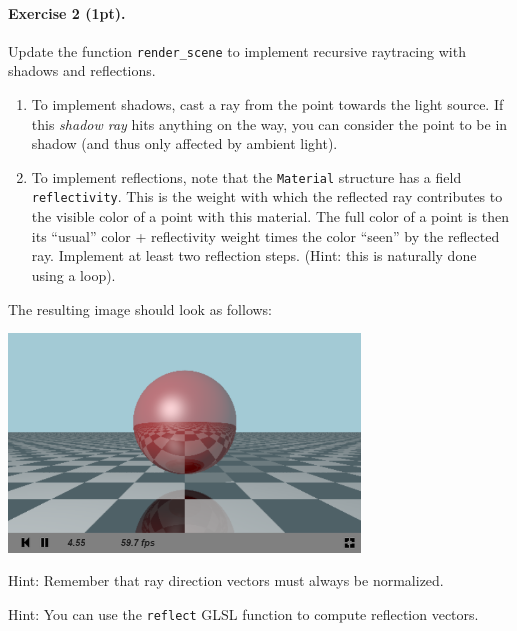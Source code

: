 \documentclass{article}
\newenvironment{exercise}[2]{\paragraph{Exercise #1 (#2pt).} }{
\medskip}
\begin{document}
\begin{exercise}{2}{1}
Update the function \verb#render_scene# to implement recursive raytracing with shadows and reflections.
\begin{enumerate}
\item To implement shadows, cast a ray from the point towards the light source. If this \emph{shadow ray} hits anything on the way, you can consider the point to be in shadow (and thus only affected by ambient light).
\item To implement reflections, note that the \verb#Material# structure has a field \verb#reflectivity#. This is the weight with which the reflected ray contributes to the visible color of a point with this material. The full color of a point is then its ``usual'' color + reflectivity weight times the color ``seen'' by the reflected ray. Implement at least two reflection steps. (Hint: this is naturally done using a loop).
\end{enumerate}
The resulting image should look as follows:
\begin{center}
\includegraphics[width=0.7\textwidth]{raytracing.png}
\end{center}

Hint: Remember that ray direction vectors must always be normalized.

Hint: You can use the \texttt{reflect} GLSL function to compute reflection vectors.
\end{exercise}
\end{document}
